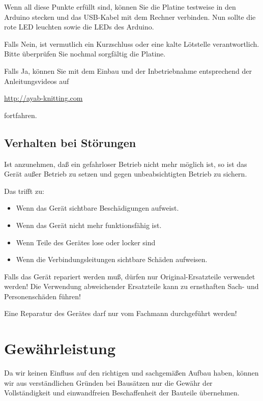 \documentclass[fleqn,10pt]{SelfArx} %
\begin{document}
Wenn all diese Punkte erfüllt sind, können Sie die Platine testweise in den Arduino stecken und das USB-Kabel mit dem Rechner verbinden. Nun sollte die rote LED leuchten sowie die LEDs des Arduino.

Falls Nein, ist vermutlich ein Kurzschluss oder eine kalte Lötstelle verantwortlich. Bitte überprüfen Sie nochmal sorgfältig die Platine.

Falls Ja, können Sie mit dem Einbau und der Inbetriebnahme entsprechend der Anleitungsvideos auf

\url{http://ayab-knitting.com}

fortfahren.

\subsection*{Verhalten bei Störungen}

Ist anzunehmen, daß ein gefahrloser Betrieb nicht mehr möglich ist, so ist das Gerät außer Betrieb zu setzen und gegen unbeabsichtigten Betrieb zu sichern.

Das trifft zu:

\begin{itemize}[noitemsep] %
\item Wenn das Gerät sichtbare Beschädigungen aufweist.
\item Wenn das Gerät nicht mehr funktionsfähig ist.
\item Wenn Teile des Gerätes lose oder locker sind
\item Wenn die Verbindungsleitungen sichtbare Schäden aufweisen.
\end{itemize}

Falls das Gerät repariert werden muß, dürfen nur Original-Ersatzteile verwendet werden! Die Verwendung abweichender Ersatzteile kann zu ernsthaften Sach- und Personenschäden führen!

Eine Reparatur des Gerätes darf nur vom Fachmann durchgeführt werden!


\section{Gewährleistung}

Da wir keinen Einfluss auf den richtigen und sachgemäßen Aufbau haben, können wir aus verständlichen Gründen bei Bausätzen nur die Gewähr der Vollständigkeit und einwandfreien Beschaffenheit der Bauteile übernehmen.
\end{document}
